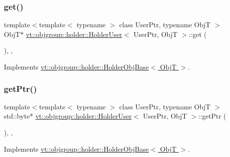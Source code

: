 \subsubsection{\texorpdfstring{get()}{get()}}
{\footnotesize\ttfamily template$<$template$<$ typename $>$ class User\+Ptr, typename ObjT $>$ \\
ObjT$\ast$ \hyperlink{structvt_1_1objgroup_1_1holder_1_1_holder_user}{vt\+::objgroup\+::holder\+::\+Holder\+User}$<$ User\+Ptr, ObjT $>$\+::get (\begin{DoxyParamCaption}{ }\end{DoxyParamCaption})\hspace{0.3cm}{\ttfamily [inline]}, {\ttfamily [override]}, {\ttfamily [virtual]}}



Implements \hyperlink{structvt_1_1objgroup_1_1holder_1_1_holder_obj_base_a4b350b0126259d31a62fd426a08f6698}{vt\+::objgroup\+::holder\+::\+Holder\+Obj\+Base$<$ Obj\+T $>$}.

\mbox{\label{structvt_1_1objgroup_1_1holder_1_1_holder_user_a85c5a7613142e86a830a0b5103f83ce4}} 
\subsubsection{\texorpdfstring{get\+Ptr()}{getPtr()}}
{\footnotesize\ttfamily template$<$template$<$ typename $>$ class User\+Ptr, typename ObjT $>$ \\
std\+::byte$\ast$ \hyperlink{structvt_1_1objgroup_1_1holder_1_1_holder_user}{vt\+::objgroup\+::holder\+::\+Holder\+User}$<$ User\+Ptr, ObjT $>$\+::get\+Ptr (\begin{DoxyParamCaption}{ }\end{DoxyParamCaption})\hspace{0.3cm}{\ttfamily [inline]}, {\ttfamily [override]}, {\ttfamily [virtual]}}



Implements \hyperlink{structvt_1_1objgroup_1_1holder_1_1_holder_obj_base_adbb4d702b76306f185e29388961e1e2d}{vt\+::objgroup\+::holder\+::\+Holder\+Obj\+Base$<$ Obj\+T $>$}.

\mbox{\label{structvt_1_1objgroup_1_1holder_1_1_holder_user_a4a43e5b38a0474cd523ccd9aa66950e9}} 
